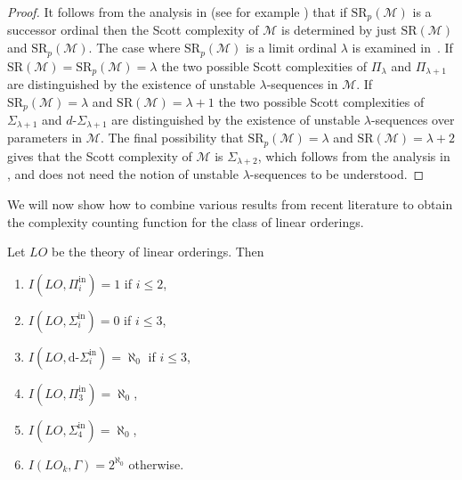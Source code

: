 \documentclass[11pt]{amsart}
\newcommand{\M}{\mathcal{M}}
\newcommand{\SR}{\text{SR}}
\newcommand{\mc}[1]{\mathcal{#1}}
\newcommand{\Pinf}[1]{\Pi^{\mathrm{in}}_{#1}}
\newcommand{\Sinf}[1]{\Sigma^{\mathrm{in}}_{#1}}
\def\Si{\Sigma}
\def\M{{\mathcal M}}
\def\dSi{d\text{-}\Si}
\theoremstyle{remark}
\begin{document}
\begin{proof}
    It follows from the analysis in \cite{AGNHTT} (see for example \cite[Table 1]{MBook}) that if $\SR_p(\M)$ is a successor ordinal then the Scott complexity of $\mc{M}$ is determined by just $\SR(\M)$ and $\SR_p(\M)$.
    The case where $\SR_p(\M)$ is a limit ordinal $\lambda$ is examined in~\cite[Lemma 1.9]{GR23}.
    If $\SR(\M)=\SR_p(\M)=\lambda$ the two possible Scott complexities of $\Pi_\lambda$ and $\Pi_{\lambda+1}$ are distinguished by the existence of unstable $\lambda$-sequences in $\mc{M}$.
    If $\SR_p(\M)=\lambda$ and $\SR(\M)=\lambda+1$ the two possible Scott complexities of $\Si_{\lambda+1}$ and $\dSi_{\lambda+1}$ are distinguished by the existence of unstable $\lambda$-sequences over parameters in $\mc{M}$.
    The final possibility that $\SR_p(\M)=\lambda$ and $\SR(\M)=\lambda+2$ gives that the Scott complexity of $\M$ is $\Si_{\lambda+2}$, which follows from the analysis in \cite{AGNHTT}, and does not need the notion of unstable $\lambda$-sequences to be understood.
\end{proof}

We will now show how to combine various results from recent literature to obtain the complexity counting function for the class of linear orderings.
\begin{theorem}\label{thm:nocolors}
    Let $LO$ be the theory of linear orderings. Then
        \begin{enumerate}
        \item $I(LO,\Pinf{i}) = 1$ if $i\leq 2$,
        \item $I(LO,\Sinf{i})=0$ if $i\leq 3$,
	\item $I(LO,\text{d-}\Sinf{i}) = \aleph_0$ if $i\leq 3$,
        \item $I(LO,\Pinf{3})=\aleph_0$,
        \item $I(LO,\Sinf{4})=\aleph_0$,
	\item $I(LO_k,\Gamma) = 2^{\aleph_0}$ otherwise.
    \end{enumerate}
\end{theorem}
\end{document}
